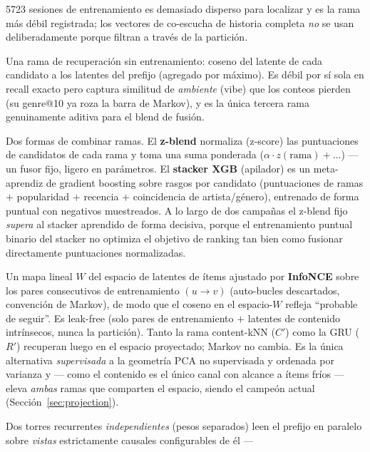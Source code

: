 \documentclass[11pt]{article}
\newcommand{\Rp}{\ensuremath{R'}}
\newcommand{\Cp}{\ensuremath{C'}}
\begin{document}
\begin{description}
  \num{5723} sesiones de entrenamiento es demasiado disperso para localizar y es
  la rama más débil registrada; los vectores de co-escucha de historia completa
  \emph{no} se usan deliberadamente porque filtran a través de la partición.
  \item[content-kNN.] Una rama de recuperación sin entrenamiento: coseno del
  latente de cada candidato a los latentes del prefijo (agregado por máximo). Es
  débil por sí sola en recall exacto pero captura similitud de \emph{ambiente}
  (vibe) que los conteos pierden (su genre@10 ya roza la barra de Markov), y es
  la única tercera rama genuinamente aditiva para el blend de fusión.
  \item[z-blend de fusión de rankings frente a stacker aprendido.] Dos formas de
  combinar ramas. El \textbf{z-blend} normaliza (z-score) las puntuaciones de
  candidatos de cada rama y toma una suma ponderada ($\alpha\cdot z(\text{rama})
  +\dots$) --- un fusor fijo, ligero en parámetros. El \textbf{stacker XGB}
  (apilador) es un meta-aprendiz de gradient boosting sobre rasgos por candidato
  (puntuaciones de ramas $+$ popularidad $+$ recencia $+$ coincidencia de
  artista/género), entrenado de forma puntual con negativos muestreados. A lo
  largo de dos campañas el z-blend fijo \emph{supera} al stacker aprendido de
  forma decisiva, porque el entrenamiento puntual binario del stacker no
  optimiza el objetivo de ranking tan bien como fusionar directamente
  puntuaciones normalizadas.
  \item[Proyección de contenido aprendida (mapa métrico supervisado).] Un mapa
  lineal $W$ del espacio de latentes de ítems ajustado por \textbf{InfoNCE} sobre
  los pares consecutivos de entrenamiento $(u\!\to\!v)$ (auto-bucles descartados,
  convención de Markov), de modo que el coseno en el espacio-$W$ refleja
  ``probable de seguir''. Es leak-free (solo pares de entrenamiento $+$ latentes
  de contenido intrínsecos, nunca la partición). Tanto la rama content-kNN (\Cp)
  como la GRU (\Rp) recuperan luego en el espacio proyectado; Markov no cambia. Es
  la única alternativa \emph{supervisada} a la geometría PCA no supervisada y
  ordenada por varianza y --- como el contenido es el único canal con alcance a
  ítems fríos --- eleva \emph{ambas} ramas que comparten el espacio, siendo el
  campeón actual (Sección~\ref{sec:projection}).
  \item[Fusión recurrente de torre doble (\texttt{seq-dualgru}).] Dos torres
  recurrentes \emph{independientes} (pesos separados) leen el prefijo en paralelo
  sobre \emph{vistas} estrictamente causales configurables de él ---

\end{description}
\end{document}
